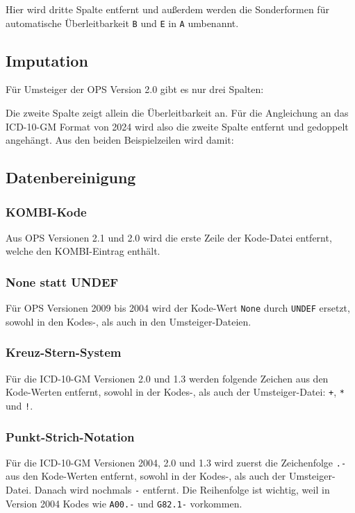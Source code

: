 Hier wird dritte Spalte entfernt und außerdem werden die Sonderformen für automatische Überleitbarkeit \texttt{B} und \texttt{E} in \texttt{A} umbenannt. 

\subsection{Imputation}

Für Umsteiger der OPS Version 2.0 gibt es nur drei Spalten: 


Die zweite Spalte zeigt allein die Überleitbarkeit an. Für die Angleichung an das ICD-10-GM Format von 2024 wird also die zweite Spalte entfernt und gedoppelt angehängt. Aus den beiden Beispielzeilen wird damit:


\subsection{Datenbereinigung}

\subsubsection{KOMBI-Kode} Aus OPS Versionen 2.1 und 2.0 wird die erste Zeile der Kode-Datei entfernt, welche den KOMBI-Eintrag enthält. 

 \subsubsection{None statt UNDEF} Für OPS Versionen 2009 bis 2004 wird der Kode-Wert \texttt{None} durch \texttt{UNDEF} ersetzt, sowohl in den Kodes-, als auch in den Umsteiger-Dateien. 

\subsubsection{Kreuz-Stern-System} Für die ICD-10-GM Versionen 2.0 und 1.3 werden folgende Zeichen aus den Kode-Werten entfernt, sowohl in der Kodes-, als auch der Umsteiger-Datei: \texttt{+}, \texttt{*} und \texttt{!}.

\subsubsection{Punkt-Strich-Notation} Für die ICD-10-GM Versionen 2004, 2.0 und 1.3 wird zuerst die Zeichenfolge \texttt{.-} aus den Kode-Werten entfernt, sowohl in der Kodes-, als auch der Umsteiger-Datei. Danach wird nochmals \texttt{-} entfernt. Die Reihenfolge ist wichtig, weil in Version 2004 Kodes wie \texttt{A00.-} und \texttt{G82.1-} vorkommen. 

